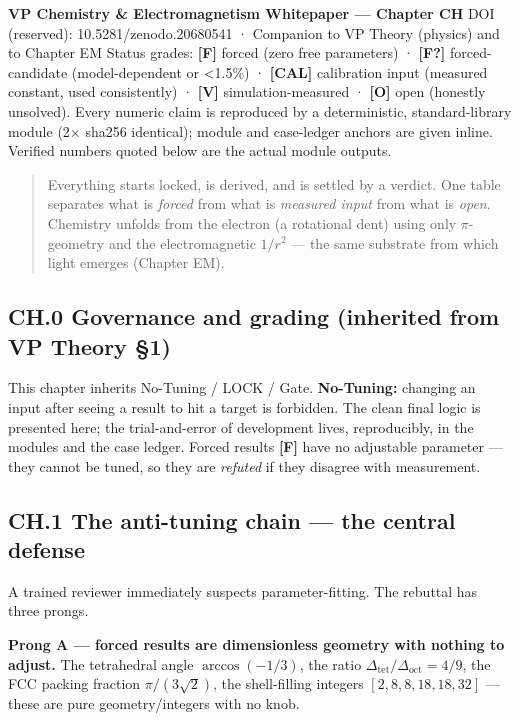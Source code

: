 \documentclass[
  10pt,
]{article}
\begin{document}
\textbf{VP Chemistry \& Electromagnetism Whitepaper --- Chapter CH} DOI
(reserved): 10.5281/zenodo.20680541 · Companion to VP Theory (physics)
and to Chapter EM Status grades: \textbf{{[}F{]}} forced (zero free
parameters) · \textbf{{[}F?{]}} forced-candidate (model-dependent or
\textless1.5\%) · \textbf{{[}CAL{]}} calibration input (measured
constant, used consistently) · \textbf{{[}V{]}} simulation-measured ·
\textbf{{[}O{]}} open (honestly unsolved). Every numeric claim is
reproduced by a deterministic, standard-library module (2× sha256
identical); module and case-ledger anchors are given inline. Verified
numbers quoted below are the actual module outputs.

\begin{quote}
Everything starts locked, is derived, and is settled by a verdict. One
table separates what is \emph{forced} from what is \emph{measured input}
from what is \emph{open}. Chemistry unfolds from the electron (a
rotational dent) using only \(\pi\)-geometry and the electromagnetic
\(1/r^2\) --- the same substrate from which light emerges (Chapter EM).
\end{quote}

\hypertarget{ch.0-governance-and-grading-inherited-from-vp-theory-1}{%
\subsection{CH.0 Governance and grading (inherited from VP Theory
§1)}\label{ch.0-governance-and-grading-inherited-from-vp-theory-1}}

This chapter inherits No-Tuning / LOCK / Gate. \textbf{No-Tuning:}
changing an input after seeing a result to hit a target is forbidden.
The clean final logic is presented here; the trial-and-error of
development lives, reproducibly, in the modules and the case ledger.
Forced results \textbf{{[}F{]}} have no adjustable parameter --- they
cannot be tuned, so they are \emph{refuted} if they disagree with
measurement.

\hypertarget{ch.1-the-anti-tuning-chain-the-central-defense}{%
\subsection{CH.1 The anti-tuning chain --- the central
defense}\label{ch.1-the-anti-tuning-chain-the-central-defense}}

A trained reviewer immediately suspects parameter-fitting. The rebuttal
has three prongs.

\textbf{Prong A --- forced results are dimensionless geometry with
nothing to adjust.} The tetrahedral angle \(\arccos(-1/3)\), the ratio
\(\Delta_{\text{tet}}/\Delta_{\text{oct}} = 4/9\), the FCC packing
fraction \(\pi/(3\sqrt2)\), the shell-filling integers
\([2,8,8,18,18,32]\) --- these are pure geometry/integers with no knob.
\end{document}
